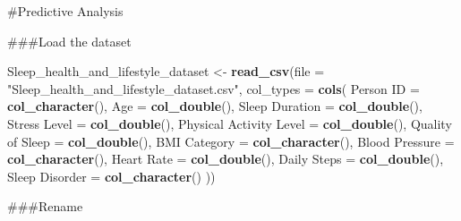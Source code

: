 \documentclass[
  11pt,
]{article}
\newenvironment{Shaded}{\begin{snugshade}}{\end{snugshade}}
\newcommand{\AttributeTok}[1]{\textcolor[rgb]{0.13,0.29,0.53}{#1}}
\newcommand{\FunctionTok}[1]{\textcolor[rgb]{0.13,0.29,0.53}{\textbf{#1}}}
\newcommand{\NormalTok}[1]{#1}
\newcommand{\OtherTok}[1]{\textcolor[rgb]{0.56,0.35,0.01}{#1}}
\newcommand{\StringTok}[1]{\textcolor[rgb]{0.31,0.60,0.02}{#1}}
\begin{document}
\#Predictive Analysis

\#\#\#Load the dataset

\begin{Shaded}
\begin{Highlighting}[]
\NormalTok{Sleep\_health\_and\_lifestyle\_dataset }\OtherTok{\textless{}{-}} \FunctionTok{read\_csv}\NormalTok{(}\AttributeTok{file =} \StringTok{"Sleep\_health\_and\_lifestyle\_dataset.csv"}\NormalTok{,}
  \AttributeTok{col\_types =} \FunctionTok{cols}\NormalTok{(}
    \StringTok{\textquotesingle{}Person ID\textquotesingle{}} \OtherTok{=} \FunctionTok{col\_character}\NormalTok{(),}
    \StringTok{\textquotesingle{}Age\textquotesingle{}} \OtherTok{=} \FunctionTok{col\_double}\NormalTok{(),}
    \StringTok{\textquotesingle{}Sleep Duration\textquotesingle{}} \OtherTok{=} \FunctionTok{col\_double}\NormalTok{(),}
    \StringTok{\textquotesingle{}Stress Level\textquotesingle{}} \OtherTok{=} \FunctionTok{col\_double}\NormalTok{(),}
    \StringTok{\textquotesingle{}Physical Activity Level\textquotesingle{}} \OtherTok{=} \FunctionTok{col\_double}\NormalTok{(),}
    \StringTok{\textquotesingle{}Quality of Sleep\textquotesingle{}} \OtherTok{=} \FunctionTok{col\_double}\NormalTok{(),}
    \StringTok{\textquotesingle{}BMI Category\textquotesingle{}} \OtherTok{=} \FunctionTok{col\_character}\NormalTok{(),}
    \StringTok{\textquotesingle{}Blood Pressure\textquotesingle{}} \OtherTok{=} \FunctionTok{col\_character}\NormalTok{(),}
    \StringTok{\textquotesingle{}Heart Rate\textquotesingle{}} \OtherTok{=} \FunctionTok{col\_double}\NormalTok{(),}
    \StringTok{\textquotesingle{}Daily Steps\textquotesingle{}} \OtherTok{=} \FunctionTok{col\_double}\NormalTok{(),}
    \StringTok{\textquotesingle{}Sleep Disorder\textquotesingle{}} \OtherTok{=} \FunctionTok{col\_character}\NormalTok{()}
\NormalTok{  ))}
\end{Highlighting}
\end{Shaded}

\#\#\#Rename
\end{document}
